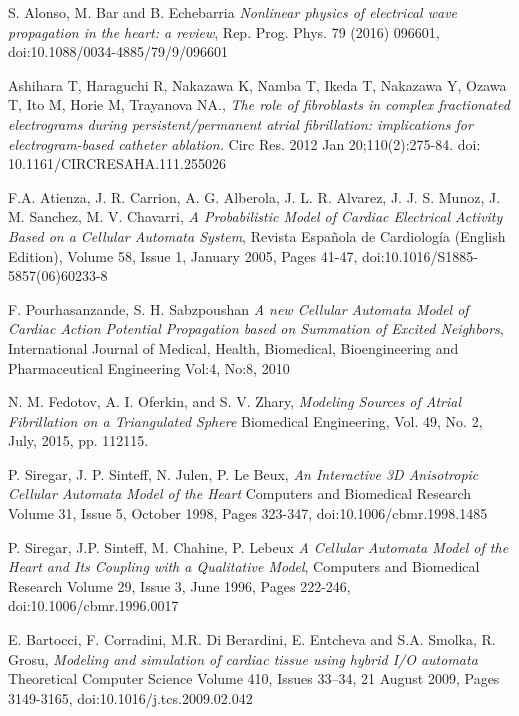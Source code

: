 \documentclass[twocolumn]{article}
\begin{document}
\begin{thebibliography}{7}
S. Alonso, M. Bar and B. Echebarria
\emph{Nonlinear physics of electrical wave
propagation in the heart: a review},
Rep. Prog. Phys. 79 (2016) 096601, 
doi:10.1088/0034-4885/79/9/096601

Ashihara T, Haraguchi R, Nakazawa K, Namba T, Ikeda T, Nakazawa Y, Ozawa T, Ito M, Horie M, Trayanova NA., 
\emph{The role of fibroblasts in complex fractionated electrograms during persistent/permanent atrial fibrillation: implications for electrogram-based catheter ablation.}
Circ Res. 2012 Jan 20;110(2):275-84. doi: 10.1161/CIRCRESAHA.111.255026

F.A. Atienza, J. R. Carrion, A. G. Alberola, J. L. R. Alvarez, J. J. S. Munoz, J. M. Sanchez, M. V. Chavarri,
\emph{A Probabilistic Model of Cardiac Electrical Activity Based on a Cellular Automata System},
Revista Española de Cardiología (English Edition), Volume 58, Issue 1, January 2005, Pages 41-47,
doi:10.1016/S1885-5857(06)60233-8

F. Pourhasanzande, S. H. Sabzpoushan
\emph{A new Cellular Automata Model of Cardiac
Action Potential Propagation based on
Summation of Excited Neighbors}, 
International Journal of Medical, Health, Biomedical, Bioengineering and Pharmaceutical Engineering Vol:4, No:8, 2010  

N. M. Fedotov,  A. I. Oferkin, and S. V. Zhary,
\emph{Modeling Sources of Atrial Fibrillation on a Triangulated Sphere}
Biomedical Engineering, Vol. 49, No. 2, July, 2015, pp. 112115. 

P. Siregar, J. P. Sinteff, N. Julen, P. Le Beux,
\emph{An Interactive 3D Anisotropic Cellular Automata Model of the Heart}
Computers and Biomedical Research
Volume 31, Issue 5, October 1998, Pages 323-347, 
doi:10.1006/cbmr.1998.1485

P. Siregar, J.P. Sinteff, M. Chahine, P. Lebeux
\emph{A Cellular Automata Model of the Heart and Its Coupling with a Qualitative Model}, 
Computers and Biomedical Research
Volume 29, Issue 3, June 1996, Pages 222-246,
doi:10.1006/cbmr.1996.0017

E. Bartocci, F. Corradini, M.R. Di Berardini, E. Entcheva and S.A. Smolka, R. Grosu, 
\emph{Modeling and simulation of cardiac tissue using hybrid I/O automata}
Theoretical Computer Science
Volume 410, Issues 33–34, 21 August 2009, Pages 3149-3165,
doi:10.1016/j.tcs.2009.02.042



\end{thebibliography}
\end{document}
